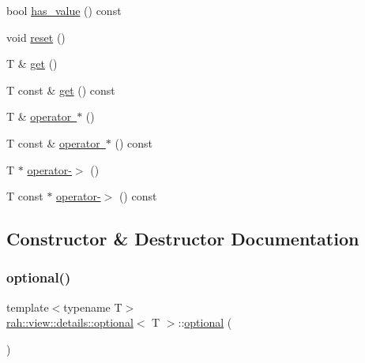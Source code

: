 \begin{DoxyCompactItemize}
\item 
bool \mbox{\hyperlink{structrah_1_1view_1_1details_1_1optional_a0d9e2223f4ef142e49b25d6553b306f3}{has\+\_\+value}} () const
\item 
void \mbox{\hyperlink{structrah_1_1view_1_1details_1_1optional_a3df63c25ba76b31c003c2faa70554ae7}{reset}} ()
\item 
T \& \mbox{\hyperlink{structrah_1_1view_1_1details_1_1optional_aec59d2702d103ac361def945f46b626b}{get}} ()
\item 
T const  \& \mbox{\hyperlink{structrah_1_1view_1_1details_1_1optional_aebb289247c0fac033c260b18c492ffec}{get}} () const
\item 
T \& \mbox{\hyperlink{structrah_1_1view_1_1details_1_1optional_a551608196fdf9f460b841a41402c827a}{operator $\ast$}} ()
\item 
T const  \& \mbox{\hyperlink{structrah_1_1view_1_1details_1_1optional_a8c163253823c31975c789ce15d52703b}{operator $\ast$}} () const
\item 
T $\ast$ \mbox{\hyperlink{structrah_1_1view_1_1details_1_1optional_ab8f628f4039e5f3a86262d710b4a885c}{operator-\/$>$}} ()
\item 
T const  $\ast$ \mbox{\hyperlink{structrah_1_1view_1_1details_1_1optional_aa4e2ccfe9217c1b960092cd44c9305ca}{operator-\/$>$}} () const
\end{DoxyCompactItemize}


\subsection{Constructor \& Destructor Documentation}
\mbox{\label{structrah_1_1view_1_1details_1_1optional_a70b8727b22b0d88c9cc823f818286c71}} 
\subsubsection{\texorpdfstring{optional()}{optional()}\hspace{0.1cm}{\footnotesize\ttfamily [1/3]}}
{\footnotesize\ttfamily template$<$typename T$>$ \\
\mbox{\hyperlink{structrah_1_1view_1_1details_1_1optional}{rah\+::view\+::details\+::optional}}$<$ T $>$\+::\mbox{\hyperlink{structrah_1_1view_1_1details_1_1optional}{optional}} (\begin{DoxyParamCaption}{ }\end{DoxyParamCaption})\hspace{0.3cm}{\ttfamily [default]}}

